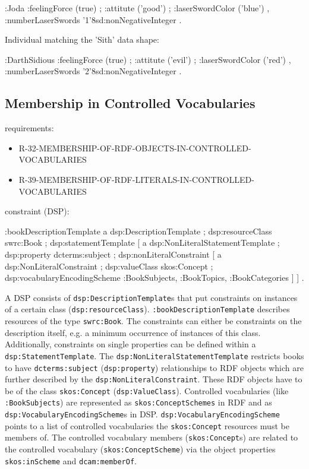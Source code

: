 \documentclass{llncs}
\newcommand{\ms}[1]{\texttt{#1}}
\begin{document}
\begin{ex}
:Joda 
    :feelingForce (true) ;
    :attitute ('good') ;
    :laserSwordColor ('blue') ,
    :numberLaserSwords '1'^^xsd:nonNegativeInteger .
\end{ex}

Individual matching the 'Sith' data shape:

\begin{ex}
:DarthSidious
    :feelingForce (true) ;
    :attitute ('evil') ;
    :laserSwordColor ('red') ,
    :numberLaserSwords '2'^^xsd:nonNegativeInteger . 
\end{ex}

\subsection{Membership in Controlled Vocabularies}

requirements:

\begin{itemize}
	\item R-32-MEMBERSHIP-OF-RDF-OBJECTS-IN-CONTROLLED-VOCABULARIES
	\item R-39-MEMBERSHIP-OF-RDF-LITERALS-IN-CONTROLLED-VOCABULARIES
\end{itemize}

constraint (DSP):

\begin{ex}
:bookDescriptionTemplate 
    a dsp:DescriptionTemplate ;
    dsp:resourceClass swrc:Book ; 
    dsp:statementTemplate [
        a dsp:NonLiteralStatementTemplate ;
        dsp:property dcterms:subject ; 
        dsp:nonLiteralConstraint [ 
            a dsp:NonLiteralConstraint ;
            dsp:valueClass skos:Concept ; 
            dsp:vocabularyEncodingScheme :BookSubjects, :BookTopics, :BookCategories ] ] .
\end{ex}

A DSP consists of \ms{dsp:DescriptionTemplate}s that put constraints on instances of a certain class (\ms{dsp:resourceClass}). 
\ms{:bookDescriptionTemplate} describes resources of the type \ms{swrc:Book}.
The constraints can either be constraints on the description itself, e.g. a minimum occurrence of instances of this class. Additionally, constraints on single properties can be defined within a \ms{dsp:StatementTemplate}.
The \ms{dsp:NonLiteralStatementTemplate} restricts books to have \ms{dcterms:subject} (\ms{dsp:property}) relationships to RDF objects which are further described by the \ms{dsp:NonLiteralConstraint}.
These RDF objects have to be of the class \ms{skos:Concept} (\ms{dsp:ValueClass}).
Controlled vocabularies (like \ms{:BookSubjects}) are represented as \ms{skos:ConceptSchemes} in RDF and as \ms{dsp:VocabularyEncodingScheme}s in DSP.
\ms{dsp:VocabularyEncodingScheme} points to a list of controlled vocabularies the \ms{skos:Concept} resources must be members of.
The controlled vocabulary members (\ms{skos:Concept}s) are related to the controlled vocabulary (\ms{skos:ConceptScheme}) via the object properties \ms{skos:inScheme} and \ms{dcam:memberOf}.
\end{document}
